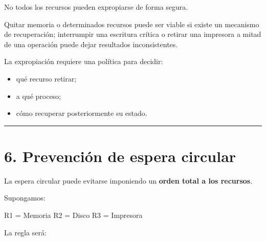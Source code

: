 \documentclass[
  spanish,
  letterpaper,
]{scrbook}
\newenvironment{Shaded}{\begin{snugshade}}{\end{snugshade}}
\newcommand{\NormalTok}[1]{\textcolor[rgb]{0.00,0.23,0.31}{#1}}
\providecommand{\tightlist}{%
  \setlength{\itemsep}{0pt}\setlength{\parskip}{0pt}}
\begin{document}
No todos los recursos pueden expropiarse de forma segura.

Quitar memoria o determinados recursos puede ser viable si existe un
mecanismo de recuperación; interrumpir una escritura crítica o retirar
una impresora a mitad de una operación puede dejar resultados
inconsistentes.

\begin{tcolorbox}[enhanced jigsaw, arc=.35mm, bottomrule=.15mm, bottomtitle=1mm, breakable, colback=white, colbacktitle=quarto-callout-warning-color!10!white, colframe=quarto-callout-warning-color-frame, coltitle=black, left=2mm, leftrule=.75mm, opacityback=0, opacitybacktitle=0.6, rightrule=.15mm, title=\textcolor{quarto-callout-warning-color}{\faExclamationTriangle}\hspace{0.5em}{Idea clave}, titlerule=0mm, toprule=.15mm, toptitle=1mm]

La expropiación requiere una política para decidir:

\begin{itemize}
\tightlist
\item
  qué recurso retirar;
\item
  a qué proceso;
\item
  cómo recuperar posteriormente su estado.
\end{itemize}

\end{tcolorbox}

\begin{center}\rule{0.5\linewidth}{0.5pt}\end{center}


\chapter{6. Prevención de espera
circular}\label{prevenciuxf3n-de-espera-circular}

La espera circular puede evitarse imponiendo un \textbf{orden total a
los recursos}.

Supongamos:

\begin{Shaded}
\begin{Highlighting}[]
\NormalTok{R1 = Memoria}
\NormalTok{R2 = Disco}
\NormalTok{R3 = Impresora}
\end{Highlighting}
\end{Shaded}

La regla será:
\end{document}
